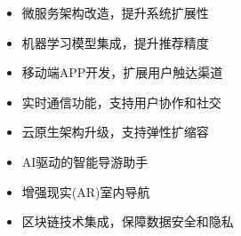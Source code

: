 \documentclass[12pt,a4paper]{article}
\begin{document}
\begin{warningbox}[title={短期优化计划 (3-6个月)}]
\begin{itemize}[nosep]
    \item 微服务架构改造，提升系统扩展性
    \item 机器学习模型集成，提升推荐精度
    \item 移动端APP开发，扩展用户触达渠道
    \item 实时通信功能，支持用户协作和社交
\end{itemize}
\end{warningbox}

\begin{successbox}[title={长期发展愿景 (1-2年)}]
\begin{itemize}[nosep]
    \item 云原生架构升级，支持弹性扩缩容
    \item AI驱动的智能导游助手
    \item 增强现实(AR)室内导航
    \item 区块链技术集成，保障数据安全和隐私
\end{itemize}
\end{successbox}
\end{document}
